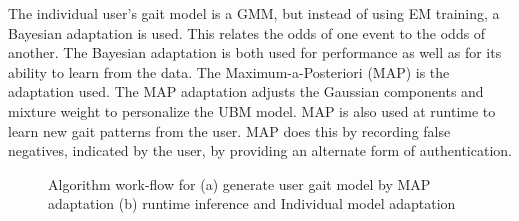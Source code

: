 \documentclass{sig-alternate}
\begin{document}
	The individual user's gait model is a GMM, but instead of using EM training, a Bayesian adaptation is used. This relates the odds of one event to the odds of another. The Bayesian adaptation is both used for performance as well as for its ability to learn from the data. The Maximum-a-Posteriori (MAP) is the adaptation used. The MAP adaptation adjusts the Gaussian components and mixture weight to personalize the UBM model. MAP is also used at runtime to learn new gait patterns from the user. MAP does this by recording false negatives, indicated by the user, by providing an alternate form of authentication. 

	

\begin{figure}
\centering
{}
\caption{Algorithm work-flow for (a) generate user gait model by MAP adaptation (b) runtime inference and Individual model adaptation}
\label{fig:TD2}
\end{figure}

\end{document}

